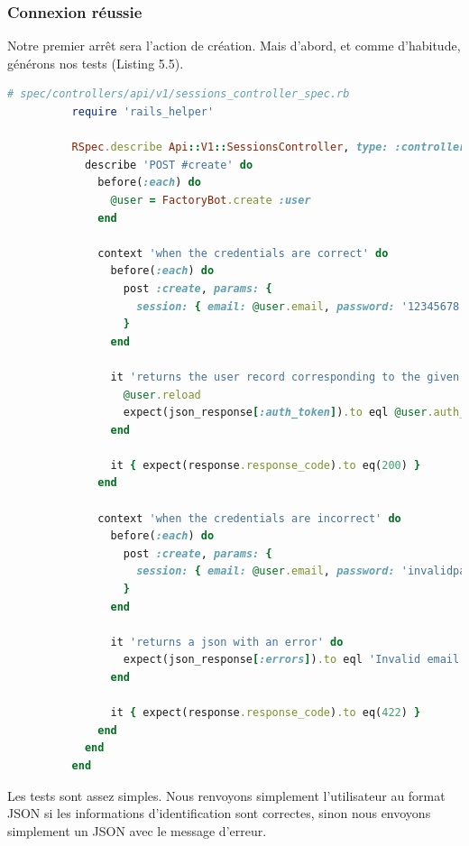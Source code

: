 \documentclass[]{report}
\begin{document}
      \subsubsection{Connexion réussie}

        Notre premier arrêt sera l'action de création. Mais d'abord, et comme d'habitude, générons nos tests (Listing 5.5).

        \begin{scriptsize}
          \begin{lstlisting}[language=ruby, caption={Création des tests du contrôlleur de sessions}, label={lst:add_sessions_controller_spec_for_create}]
          # spec/controllers/api/v1/sessions_controller_spec.rb
          require 'rails_helper'

          RSpec.describe Api::V1::SessionsController, type: :controller do
            describe 'POST #create' do
              before(:each) do
                @user = FactoryBot.create :user
              end

              context 'when the credentials are correct' do
                before(:each) do
                  post :create, params: {
                    session: { email: @user.email, password: '12345678' }
                  }
                end

                it 'returns the user record corresponding to the given credentials' do
                  @user.reload
                  expect(json_response[:auth_token]).to eql @user.auth_token
                end

                it { expect(response.response_code).to eq(200) }
              end

              context 'when the credentials are incorrect' do
                before(:each) do
                  post :create, params: {
                    session: { email: @user.email, password: 'invalidpassword' }
                  }
                end

                it 'returns a json with an error' do
                  expect(json_response[:errors]).to eql 'Invalid email or password'
                end

                it { expect(response.response_code).to eq(422) }
              end
            end
          end
          \end{lstlisting}
        \end{scriptsize}

        Les tests sont assez simples. Nous renvoyons simplement l'utilisateur au format JSON si les informations d'identification sont correctes, sinon nous envoyons simplement un JSON avec le message d'erreur.
\end{document}
